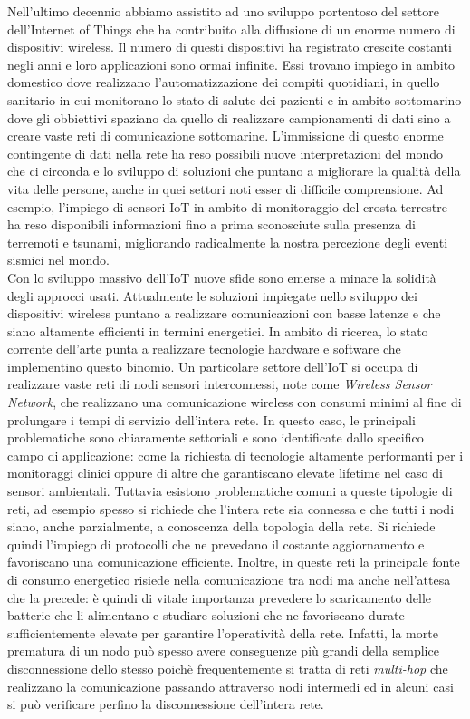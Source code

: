 \documentclass[binding=0.6cm,TFA]{sapthesis}
\begin{document}
Nell'ultimo decennio abbiamo assistito ad uno sviluppo portentoso del settore dell'Internet of Things che ha contribuito alla diffusione
di un enorme numero di dispositivi wireless. Il numero di questi dispositivi ha registrato crescite costanti negli anni e loro applicazioni sono ormai infinite.
Essi trovano impiego in ambito domestico dove realizzano l'automatizzazione dei compiti quotidiani, in quello sanitario in cui monitorano lo stato di salute
dei pazienti e in ambito sottomarino dove gli obbiettivi spaziano da quello di realizzare campionamenti di dati sino a creare vaste reti di comunicazione sottomarine.
L'immissione di questo enorme contingente di dati nella rete ha reso possibili nuove interpretazioni del mondo che ci circonda e lo sviluppo di soluzioni che puntano
a migliorare la qualità della vita delle persone, anche in quei settori noti esser di difficile comprensione. Ad esempio, l'impiego di sensori IoT in ambito di
monitoraggio del crosta terrestre ha reso disponibili informazioni fino a prima sconosciute sulla presenza di terremoti e tsunami, migliorando radicalmente
la nostra percezione degli eventi sismici nel mondo.\\

Con lo sviluppo massivo dell'IoT nuove sfide sono emerse a minare la solidità degli approcci usati. Attualmente le soluzioni impiegate nello sviluppo
dei dispositivi wireless puntano a realizzare comunicazioni con basse latenze e che siano altamente efficienti in termini energetici. In ambito di ricerca,
lo stato corrente dell'arte punta a realizzare tecnologie hardware e software che implementino questo binomio. Un particolare
settore dell'IoT si occupa di realizzare vaste reti di nodi sensori interconnessi, note come \emph{Wireless Sensor Network},
che realizzano una comunicazione wireless con consumi minimi al fine di prolungare i tempi di servizio dell'intera rete. In questo caso,
le principali problematiche sono chiaramente settoriali e sono identificate dallo specifico campo di applicazione: come la richiesta di tecnologie
altamente performanti per i monitoraggi clinici oppure di altre che garantiscano elevate lifetime nel caso di sensori ambientali. Tuttavia esistono
problematiche comuni a queste tipologie di reti, ad esempio spesso si richiede che l'intera rete sia connessa e che tutti i nodi siano,
anche parzialmente, a conoscenza della topologia della rete. Si richiede quindi l'impiego di protocolli che ne prevedano il
costante aggiornamento e favoriscano una comunicazione efficiente. Inoltre, in queste reti la principale fonte di consumo energetico risiede
nella comunicazione tra nodi ma anche nell'attesa che la precede: è quindi di vitale importanza prevedere lo scaricamento delle batterie che li alimentano
e studiare soluzioni che ne favoriscano durate sufficientemente elevate per garantire l'operatività della rete. Infatti, la morte prematura di un nodo
può spesso avere conseguenze più grandi della semplice disconnessione dello stesso poichè frequentemente si tratta di reti \emph{multi-hop} che
realizzano la comunicazione passando attraverso nodi intermedi ed in alcuni casi si può verificare perfino la disconnessione dell'intera rete.\\
\end{document}

